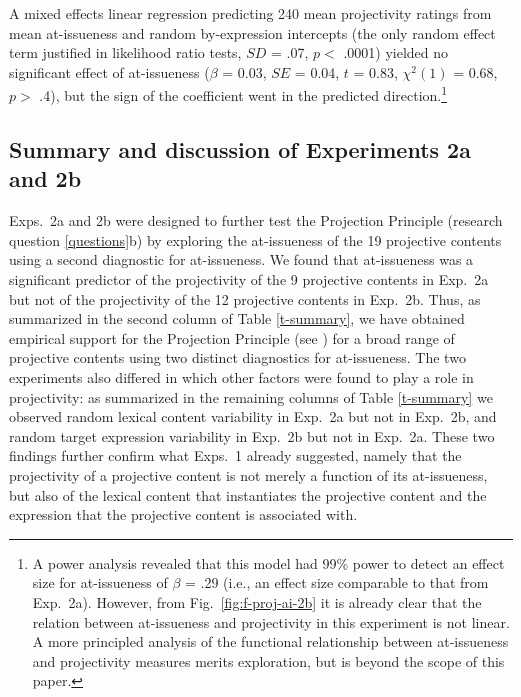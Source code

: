 \documentclass[11pt,fleqn]{article}
\newcommand{\6}{\mbox{$[\hspace*{-.6mm}[$}}
\newcommand{\9}{\mbox{$]\hspace*{-.6mm}]$}}
\newcommand{\figref}[1]{Fig.~\ref{#1}}
\begin{document}
A mixed effects linear regression predicting 240 mean projectivity ratings from mean at-issueness and random by-expression intercepts (the only random effect term justified in likelihood ratio tests, $SD$ = .07, $p <$ .0001) yielded no significant effect of at-issueness ($\beta$ = 0.03, $SE$ = 0.04, $t$ = 0.83, $\chi^2(1)$ = 0.68, $p >$ .4), but the sign of the coefficient went in the predicted direction.\footnote{A power analysis revealed that this model had 99\% power to detect an effect size for at-issueness of $\beta$ = .29 (i.e., an effect size comparable to that from Exp.~2a).  However, from \figref{fig:f-proj-ai-2b} it is already clear that the relation between at-issueness and projectivity in this experiment is not linear. A more principled analysis of the functional relationship between at-issueness and projectivity measures merits exploration, but is beyond the scope of this paper.   %
}



\subsection{Summary and discussion of Experiments 2a and 2b}\label{s-disc2}

Exps.~2a and 2b were designed to further test the Projection Principle (research question \ref{questions}b) by exploring the at-issueness of the 19 projective contents using a second diagnostic for at-issueness. We found that at-issueness was a significant predictor of the projectivity of the 9 projective contents in Exp.~2a but not of the projectivity of the 12 projective contents in Exp.~2b. Thus, as summarized in the second column of Table \ref{t-summary}, we have obtained empirical support for the Projection Principle (see \citealt{brst-salt10,brst-ar}) for a broad range of projective contents using two distinct diagnostics for at-issueness. The two experiments also differed in which other factors were found to play a role in projectivity: as summarized in the remaining columns of Table \ref{t-summary} we observed random lexical content variability in Exp.~2a but not in Exp.~2b, and random target expression variability in Exp.~2b but not in Exp.~2a. These two findings further confirm what Exps.~1 already suggested, namely that the projectivity of a projective content is not merely a function of its at-issueness, but also of the lexical content that instantiates the projective content and the expression that the projective content is associated with. 
\end{document}
